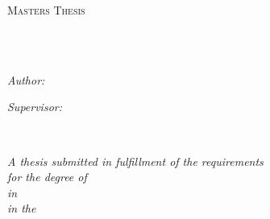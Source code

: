 \documentclass[
11pt, %
english, %
singlespacing, %
headsepline, %
]{style} %
\author{Andre M M \textsc{Faria}} %
\begin{document}
\frontmatter %

\pagestyle{plain} %


\begin{titlepage}
	\begin{center}

		\vspace*{.06\textheight}
		{\scshape\LARGE \univname\par}\vspace{1.5cm} %
		\textsc{\Large Masters Thesis}\\[0.5cm] %

		\HRule \\[0.4cm] %
		{\huge \bfseries \ttitle\par}\vspace{0.4cm} %
		\HRule \\[1.5cm] %

		\begin{minipage}[t]{0.4\textwidth}
			\begin{flushleft} \large
				\emph{Author:}\\
				\href{https://www.linkedin.com/in/andremmfaria/}{\authorname} %
			\end{flushleft}
		\end{minipage}
		\begin{minipage}[t]{0.4\textwidth}
			\begin{flushright} \large
				\emph{Supervisor:} \\
				\href{https://www.tudublin.ie/explore/faculties-and-schools/computing-digital-data/informatics-and-cybersecurity/people/academic-staff/robertsmith.php}{\supname} %
			\end{flushright}
		\end{minipage}\\[2cm]

		\vfill

		\large \textit{A thesis submitted in fulfillment of the requirements\\ for the degree of \degreename\\ in \subjectname}\\[0.4cm] %
		\textit{in the}\\[0.4cm]
		\deptname\\[2cm] %


\end{center}
\end{titlepage}
\end{document}
